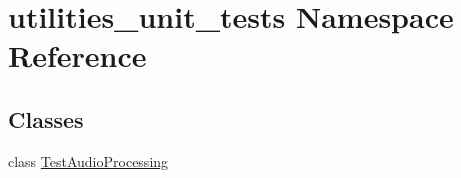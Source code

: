 \hypertarget{namespaceutilities__unit__tests}{\section{utilities\-\_\-unit\-\_\-tests Namespace Reference}
\label{namespaceutilities__unit__tests}
}
\subsection*{Classes}
\begin{DoxyCompactItemize}
\item 
class \hyperlink{classutilities__unit__tests_1_1TestAudioProcessing}{Test\-Audio\-Processing}
\end{DoxyCompactItemize}
